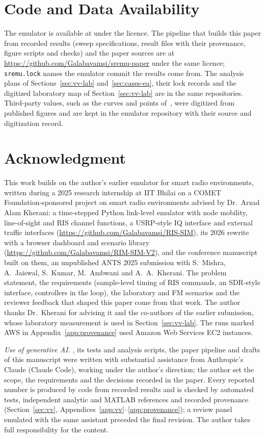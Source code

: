 \section*{Code and Data Availability}
The emulator \sremu{} is available at \txtRepoUrl{} under the \txtLicence{}
licence. The pipeline that builds this paper from recorded results (sweep specifications,
result files with their provenance, figure scripts and checks) and the paper sources are at
\url{https://github.com/Galabavamsi/sremu-paper} under the same licence; \texttt{sremu.lock}
names the emulator commit the results come from. The analysis plans of
Sections~\ref{sec:vv-lab} and~\ref{sec:cases-ea}, their lock records and the digitized
laboratory map of Section~\ref{sec:vv-lab} are in the same repositories. Third-party values,
such as the curves and points of~\cite{Tang2022mmWave}, were digitized from published figures
and are kept in the emulator repository with their source and digitization record.

\section*{Acknowledgment}
This work builds on the author's earlier emulator for smart radio environments,
written during a 2025 research internship at IIT Bhilai on a COMET Foundation-sponsored
project on smart radio environments advised by Dr.~Arzad Alam Kherani: a time-stepped Python
link-level emulator with node mobility, line-of-sight and RIS channel functions, a USRP-style
IQ interface and external traffic interfaces
(\url{https://github.com/Galabavamsi/RIS-SIM}), its 2026 rewrite with a browser dashboard and
scenario library (\url{https://github.com/Galabavamsi/RIM-SIM-V2}), and the conference
manuscript built on them, an unpublished ANTS 2025 submission with S.~Mishra, A.~Jaiswal,
S.~Kumar, M.~Ambwani and A.~A.~Kherani. The problem statement, the requirements (sample-level
timing of RIS commands, an SDR-style interface, controllers in the loop), the laboratory and
FM scenarios and the reviewer feedback that shaped this paper come from that work. The author
thanks Dr.~Kherani for advising it and the co-authors of the earlier submission, whose
laboratory measurement is used in Section~\ref{sec:vv-lab}. The runs marked AWS in
Appendix~\ref{app:provenance} used Amazon Web Services EC2 instances.

\emph{Use of generative AI.} \sremu{}, its tests and analysis scripts, the paper pipeline and
drafts of this manuscript were written with substantial assistance from Anthropic's Claude
(Claude Code), working under the author's direction; the author set the scope, the
requirements and the decisions recorded in the paper. Every reported number is produced by
code from recorded results and is checked by automated tests, independent analytic and MATLAB
references and recorded provenance (Section~\ref{sec:vv}, Appendices~\ref{app:vv}--\ref{app:provenance}); a review panel
emulated with the same assistant preceded the final revision. The author takes full
responsibility for the content.
